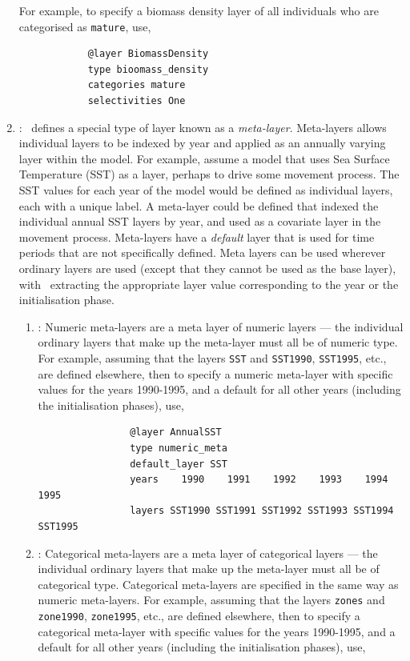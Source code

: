 \begin{enumerate}
	For example, to specify a biomass density layer of all individuals who are categorised as \texttt{mature}, use,
	{\small{\begin{verbatim}
			@layer BiomassDensity
			type bioomass_density
			categories mature
			selectivities One
			\end{verbatim}}}

	\item {\label{meta-layers}}: \IBM\ defines a special type of layer known as a \emph{meta-layer}. Meta-layers allows individual layers to be indexed by year and applied as an annually varying layer within the model. For example, assume a model that uses Sea Surface Temperature (SST) as a layer, perhaps to drive some movement process. The SST values for each year of the model would be defined as individual layers, each with a unique label. A meta-layer could be defined that indexed the individual annual SST layers by year, and used as a covariate layer in the movement process. Meta-layers have a \emph{default} layer that is used for time periods that are not specifically defined. Meta layers can be used wherever ordinary layers are used (except that they cannot be used as the base layer), with \IBM\ extracting the appropriate layer value corresponding to the year or the initialisation phase.
	
	\begin{enumerate}
		
		\item {\label{numeric meta-layer}}: Numeric meta-layers are a meta layer of numeric layers --- the individual ordinary layers that make up the meta-layer must all be of numeric type. For example, assuming that the layers \texttt{SST} and \texttt{SST1990}, \texttt{SST1995}, etc., are defined elsewhere, then to specify a numeric meta-layer with specific values for the years 1990-1995, and a default for all other years (including the initialisation phases), use, 
		
		{\small{\begin{verbatim}
				@layer AnnualSST
				type numeric_meta
				default_layer SST
				years    1990    1991    1992    1993    1994    1995
				layers SST1990 SST1991 SST1992 SST1993 SST1994 SST1995
				\end{verbatim}}}
		
		\item {\label{categorical meta-layer}}: Categorical meta-layers are a meta layer of categorical layers --- the individual ordinary layers that make up the meta-layer must all be of categorical type. Categorical meta-layers are specified in the same way as numeric meta-layers. For example, assuming that the layers \texttt{zones} and \texttt{zone1990}, \texttt{zone1995}, etc., are defined elsewhere, then to specify a categorical meta-layer with specific values for the years 1990-1995, and a default for all other years (including the initialisation phases), use, 
		

\end{enumerate}
\end{enumerate}
